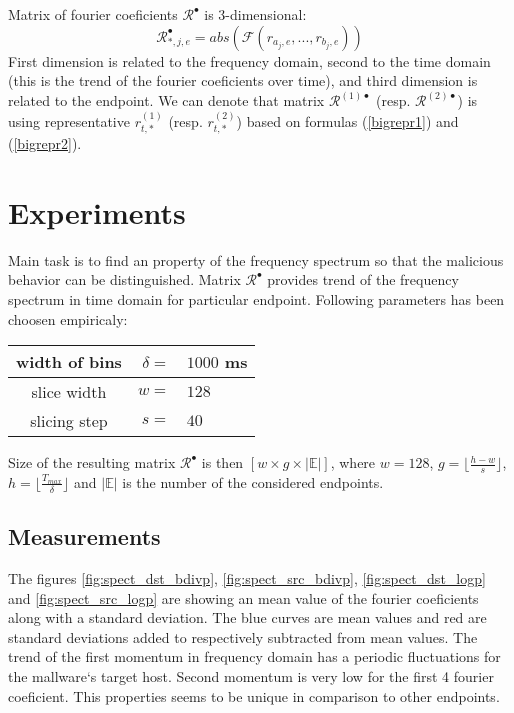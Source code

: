 Matrix of fourier coeficients $\mathcal{R}^\bullet$ is 3-dimensional:
\begin{equation}\label{bigmatrix}
\mathcal{R}^\bullet_{*,j,e} = abs(\mathcal{F}(r_{a_j,e}, ..., r_{b_j,e}))
\end{equation}
First dimension is related to the frequency domain, second to the time domain 
(this is the trend of the fourier coeficients over time), 
and third dimension is related to the endpoint.
We can denote that matrix $\mathcal{R}^{(1)\bullet}$ (resp. $\mathcal{R}^{(2)\bullet}$)
is using representative $r_{t,*}^{(1)}$ (resp. $r_{t,*}^{(2)}$) based on formulas
(\ref{bigrepr1}) and (\ref{bigrepr2}).

\section{Experiments}
Main task is to find an property of the frequency spectrum so that the malicious behavior
can be distinguished. Matrix $\mathcal{R}^\bullet$ provides trend of the frequency spectrum
in time domain for particular endpoint.
Following parameters has been choosen empiricaly:

\begin{center}
\begin{tabular}{c|rl}
width of bins & $\delta =$ & $1000$ ms \\ \hline
slice width & $w =$ & $128$ \\ \hline
slicing step & $s=$ & $40$ \\
\end{tabular}
\end{center}

Size of the resulting matrix $\mathcal{R}^\bullet$ is then
$[w\times g\times \lvert\mathbb{E}\rvert]$, where $w=128$, $g=\lfloor\frac{h-w}{s} \rfloor$, 
$h = \lfloor\frac{T_{max}}{\delta}\rfloor$ and $\lvert\mathbb{E}\rvert $ is the number of the 
considered endpoints.

\subsection{Measurements}
The figures \ref{fig:spect_dst_bdivp},
\ref{fig:spect_src_bdivp}, \ref{fig:spect_dst_logp} and \ref{fig:spect_src_logp} are 
showing an mean value of the fourier coeficients along with a standard deviation.
The blue curves are mean values and red are standard deviations added to respectively 
subtracted from mean values. 
The trend of the first momentum in frequency domain has a periodic fluctuations
for the mallware`s target host. Second momentum is
very low for the first 4 fourier coeficient. This properties seems to be unique in 
comparison to other endpoints.


